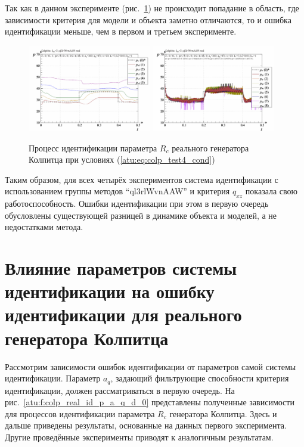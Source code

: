 Так как в данном эксперименте
(рис.~\ref{atu:f:colp_r_id_4})
не происходит попадание в область,
где зависимости критерия для модели и объекта заметно отличаются,
то и ошибка идентификации меньше, чем в первом и третьем эксперименте.

\begin{figure}[htb!]
  \centerline{
    \includegraphics[width=0.48\textwidth]{p/r/colp_real_id-p_t_pi_ql3rlWvnAAW_real_d_3.png}
    \hfill
    \includegraphics[width=0.48\textwidth]{p/r/colp_real_id-p_t_p_ql3rlWvnAAW_real_d_3.png}
  }
  \caption{Процесс идентификации параметра $R_c$ реального генератора Колпитца при условиях (\ref{atu:eq:colp_test4_cond})}
  \label{atu:f:colp_r_id_4}
\end{figure}

Таким образом, для всех четырёх экспериментов система идентификации
с использованием группы методов ``ql3rlWvnAAW'' и критерия $q_{xz}$
показала свою работоспособность. Ошибки идентификации при этом
в первую очередь обусловлены существующей разницей в динамике
объекта и моделей, а не недостатками метода.



\section{Влияние параметров системы идентификации на ошибку идентификации для реального генератора Колпитца}  %


Рассмотрим зависимости ошибок идентификации от параметров самой системы идентификации.
Параметр $a_q$, задающий
фильтрующие способности критерия идентификации, должен рассматриваться в первую очередь.
На рис.~\ref{atu:f:colp_real_id_p_a_q_d_0} представлены полученные зависимости
для процессов идентификации параметра $R_c$ генератора Колпитца.
Здесь и дальше приведены результаты, основанные на данных первого эксперимента.
Другие проведённые эксперименты приводят к аналогичным результатам.

